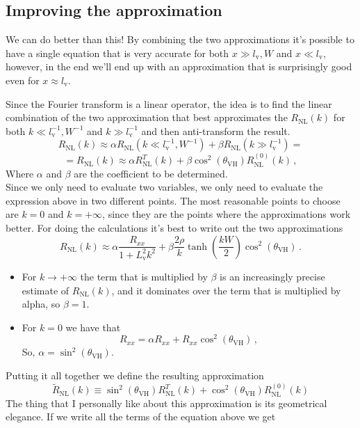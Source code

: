 \subsection{Improving the approximation}
We can do better than this! By combining the two approximations it's possible to have a single equation that is very accurate for both $x\gg l_\textrm{v},W$ and $x\ll l_\textrm{v}$, however, in the end we'll end up with an approximation that is surprisingly good even for  $x\approx l_\textrm{v}$.

Since the Fourier transform is a linear operator, the idea is to find the linear combination of the two approximation that best approximates the $R_{\textrm{NL}}(k)$ for both $k\ll l_\textrm{v}^{-1},W^{-1}$ and $k\gg l_\textrm{v}^{-1}$ and then anti-transform the result.
\[
    R_{\textrm{NL}}(k)\approx \alpha R_{\textrm{NL}}(k\ll l_\textrm{v}^{-1},W^{-1}) +\beta R_{\textrm{NL}}(k\gg l_\textrm{v}^{-1})=
\]
\[
    =R_{\textrm{NL}}(k)\approx \alpha R_{\textrm{NL}}^T(k) +\beta\cos^2(\theta_{\textrm{VH}}) R_{\textrm{NL}}^{(0)}(k)\,,      
\]
Where $\alpha$ and $\beta$ are the coefficient to be determined.\\
Since we only need to evaluate two variables, we only need to evaluate the expression above in two different points. The most reasonable points to choose are $k=0$ and $k=+\infty$, since they are the points where the approximations work better. For doing the calculations it's best to write out the two approximations 
\[
    R_{\textrm{NL}}(k)\approx 
    \alpha \frac {R_{xx}}{1+L_\textrm{v}^2k^2}+
    \beta\frac {2\rho}{k}\tanh\left(\frac{kW}2\right)\cos^2(\theta_{\textrm{VH}})\,.
\]
\begin{itemize}
    \item For $k\to +\infty$ the term that is multiplied by $\beta$ is an increasingly precise estimate of $R_{\textrm{NL}}(k)$, and it dominates over the term that is multiplied by alpha, so $\beta=1$.
    \item For $k=0$ we have that
    \[
        R_{xx}=\alpha R_{xx} +  R_{xx}\cos^2(\theta_{\textrm{VH}})\,,   
    \]
    So, $\alpha=\sin^2(\theta_{\textrm{VH}})$. 
\end{itemize}
Putting it all together we define the resulting approximation
\begin{equation}
    \boxed{
        \tilde R_{\textrm{NL}}(k)\equiv
        \sin^2(\theta_{\textrm{VH}})R_{\textrm{NL}}^{T}(k)+
        \cos^2(\theta_{\textrm{VH}})R_{\textrm{NL}}^{(0)}(k)
    }
\end{equation}
The thing that I personally like about this approximation is its geometrical elegance. If we write all the terms of the equation above we get
